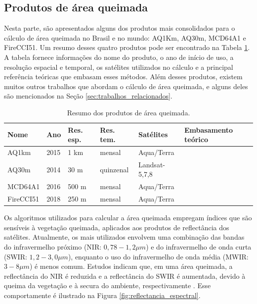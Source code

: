 \documentclass[cic,tc]{iiufrgs}
\begin{document}
\subsection*{Produtos de área queimada}

Nesta parte, são apresentados alguns dos produtos mais consolidados para o cálculo de área queimada no Brasil e no mundo: AQ1Km, AQ30m, MCD64A1 e FireCCI51. Um resumo desses quatro produtos pode ser encontrado na Tabela \ref{table:resumo_produtos_area_queimada}. A tabela fornece informações do nome do produto, o ano de início de uso, a resolução espacial e temporal, os satélites utilizados no cálculo e a principal referência teóricas que embasam esses métodos. Além desses produtos, existem muitos outros trabalhos que abordam o cálculo de área queimada, e alguns deles são mencionados na Seção \ref{sec:trabalhos_relacionados}. 

\begin{table}[!htb]
\centering
\caption{Resumo dos produtos de área queimada.}
\begin{tabular}{ @{}llllll@{} }
  \toprule
  \textbf{Nome} & \textbf{Ano} & \textbf{Res. esp.} & \textbf{Res. tem.} & \textbf{Satélites} & \textbf{Embasamento teórico} \\
  \midrule
  AQ1km & 2015 & 1 km & mensal & Aqua/Terra & \citet{libonati2015algorithm} \\
  AQ30m & 2014 & 30 m & quinzenal & Landsat-5,7,8 & \citet{melchiori2014landsat} \\
  MCD64A1 & 2016  & 500 m & mensal & Aqua/Terra & \citet{GIGLIO201872} \\
  FireCCI51 & 2018 & 250 m & mensal & Aqua/Terra & \citet{Lizundia2020} \\
  \bottomrule
\end{tabular}
\label{table:resumo_produtos_area_queimada}
\end{table}

Os algoritmos utilizados para calcular a área queimada empregam índices que são sensíveis à vegetação queimada, aplicados aos produtos de reflectância dos satélites. Atualmente, os mais utilizados envolvem uma combinação das bandas do infravermelho próximo (NIR: $0,78-1,2\mu m$) e do infravermelho de onda curta (SWIR: $1,2-3,0\mu m$), enquanto o uso do infravermelho de onda média (MWIR: $3-8 \mu m$) é menos comum. Estudos indicam que, em uma área queimada, a reflectância do NIR é reduzida e a reflectância do SWIR é aumentada, devido à queima da vegetação e à secura do ambiente, respectivamente \citep{CHUVIECO201945}. Esse comportamente é ilustrado na Figura \ref{fig:reflectancia_espectral}.
\end{document}
